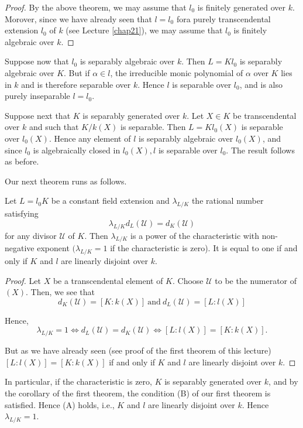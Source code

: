 \begin{proof}
  By the above theorem, we may assume that $l_0$ is finitely generated
  over $k$. Morover, since we have already seen that $l= l_0$ for\pageoriginale a
  purely transcendental extension $l_0$ of $k$ (see Lecture \ref{chap21}), we
  may assume that $l_0$ is finitely algebraic over $k$. 
\end{proof}

Suppose now that $l_0$ is separably algebraic over $k$. Then $L =
Kl_0$ is separably algebraic over $K$. But if $\alpha \in l$, the
irreducible monic polynomial of $\alpha$ over $K$ lies in $k$ and is
therefore separable over $k$. Hence $l$ is separable over $l_0$, and
is also purely inseparable $l = l_0$. 

Suppose next that $K$ is separably generated over $k$. Let $X \in K$
be transcendental over $k$ and such that $K/k(X)$ is separable. Then
$L = Kl_0 (X)$ is separable over $l_0(X)$. Hence any element of $l$ is
separably algebraic over $l_0(X)$, and since $l_0$ is algebraically
closed in $l_0(X), l$ is separable over $l_0$. The result follows as
before. 

Our next theorem runs as follows.

\begin{theorem*}
  Let $L = l_0 K$ be a constant field extension and $\lambda_{L/K}$
  the rational number satisfying 
  $$
  \lambda_{L/K} d_L (\mathscr{U}) = d_K (\mathscr{U})
  $$
  for any divisor $\mathscr{U}$ of $K$. Then $\lambda_{L/K}$ is a
  power of the characteristic with non-negative exponent
  $(\lambda_{L/K} = 1$ if the characteristic is zero). It is equal to
  one if and only if $K$ and $l$ are linearly disjoint over $k$. 
\end{theorem*}

\begin{proof}
  Let $X$ be a transcendental element of $K$. Choose $\mathscr{U}$ to
  be the numerator of $(X)$. Then, we see that 
  $$
  d_K(\mathscr{U}) = [K : k(X)] ~ \text{and} ~ d_L (\mathscr{U}) = [L : l(X)]
  $$
  
  Hence,\pageoriginale\
  $$
  \lambda_{L/K} = 1 \Leftrightarrow d_L(\mathscr{U}) =
  d_K(\mathscr{U}) \Leftrightarrow [L : l(X)] = [K : k(X)]. 
  $$

  But as we have already seen (see proof of the first theorem of this
  lecture) $[L : l(X)] = [K : k(X)]$ if and only if $K$ and $l$ are
  linearly disjoint over $k$. 
\end{proof}

In particular, if the characteristic is zero, $K$ is separably
generated over $k$, and by the corollary of the first theorem, the
condition (B) of our first theorem is satisfied. Hence (A) holds,
i.e., $K$ and $l$ are linearly disjoint over $k$. Hence $\lambda_{L
  /K} = 1$.  

